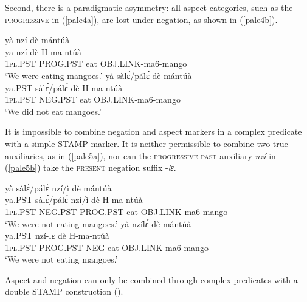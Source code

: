 Second, there is a paradigmatic asymmetry: all aspect categories, such as the \textsc{progressive} in (\ref{pale4a}), are lost under negation, as shown in (\ref{pale4b}).

\begin{exe} 
\ex\label{pale4}
\begin{xlist}
\ex\label{pale4a} 
  \glll     yà nzí  dè mántúà  \\
          ya nzí dè H-ma-ntúà \\
              1\textsc{pl}.PST PROG.PST eat OBJ.LINK-ma6-mango   \\
    \trans `We were eating mangoes.'
\ex\label{pale4b}
  \glll     yà sàlɛ́/pálɛ́ dè mántúà \\
            ya.PST sàlɛ́/pálɛ́ dè H-ma-ntúà \\
              1\textsc{pl}.PST NEG.PST eat OBJ.LINK-ma6-mango   \\
    \trans `We did not eat mangoes.'
\end{xlist}
\end{exe}

\noindent It is impossible to combine negation and aspect markers in a complex predicate with a simple STAMP marker. It is neither permissible to combine two true auxiliaries, as in (\ref{pale5a}), nor can the \textsc{progressive past} auxiliary {\itshape nzí} in (\ref{pale5b}) take the \textsc{present} negation suffix -{\itshape lɛ}.

\begin{exe} 
\ex\label{pale5}
\begin{xlist}
\ex\label{pale5a}
  \glll     *yà sàlɛ́/pálɛ́ nzí/ì dè mántúà \\
            ya.PST sàlɛ́/pálɛ́ nzí/ì dè H-ma-ntúà \\
              1\textsc{pl}.PST NEG.PST PROG.PST eat OBJ.LINK-ma6-mango   \\
    \trans `We were not eating mangoes.'
\ex\label{pale5b}
  \glll     *yà nzílɛ́ dè mántúà  \\
            ya.PST nzí-lɛ dè H-ma-ntúà \\
              1\textsc{pl}.PST PROG.PST-NEG eat OBJ.LINK-ma6-mango   \\
    \trans `We were not eating mangoes.'
\end{xlist}
\end{exe}

\noindent Aspect and negation can only be combined through complex predicates with a double STAMP construction ().









